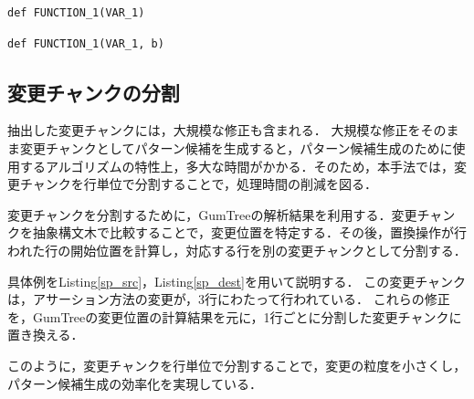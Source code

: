 \documentclass[11pt]{jreport}
\begin{document}
\begin{minipage}[b]{0.48\textwidth}
\begin{lstlisting}[caption=抽象化後の修正前ソースコード,label=list:abst_A]
def FUNCTION_1(VAR_1)
\end{lstlisting}
\end{minipage}
\begin{minipage}[b]{0.48\textwidth}
\begin{lstlisting}[caption=抽象化後の修正後ソースコード,label=list:abst_B]
def FUNCTION_1(VAR_1, b)
\end{lstlisting}
\end{minipage}

\subsection{変更チャンクの分割}
抽出した変更チャンクには，大規模な修正も含まれる．
大規模な修正をそのまま変更チャンクとしてパターン候補を生成すると，パターン候補生成のために使用するアルゴリズムの特性上，多大な時間がかかる．そのため，本手法では，変更チャンクを行単位で分割することで，処理時間の削減を図る．

変更チャンクを分割するために，GumTreeの解析結果を利用する．変更チャンクを抽象構文木で比較することで，変更位置を特定する．その後，置換操作が行われた行の開始位置を計算し，対応する行を別の変更チャンクとして分割する．

具体例をListing\ref{sp_src}，Listing\ref{sp_dest}を用いて説明する．
この変更チャンクは，アサーション方法の変更が，3行にわたって行われている．
これらの修正を，GumTreeの変更位置の計算結果を元に，1行ごとに分割した変更チャンクに置き換える．

このように，変更チャンクを行単位で分割することで，変更の粒度を小さくし，パターン候補生成の効率化を実現している．
\end{document}
